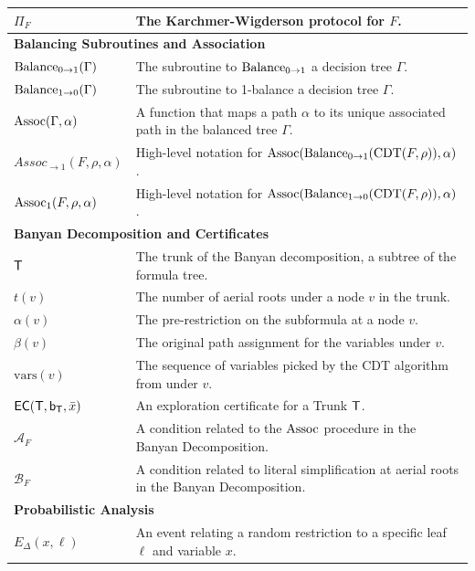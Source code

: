 \begin{table}[h!]
\begin{tabular}{|l|l|}
$\Pi_F$ & The Karchmer-Wigderson protocol for $F$. \\
\hline
\multicolumn{2}{|l|}{\textbf{Balancing Subroutines and Association}} \\
\hline
$\operatorname{Balance_{0 \to 1}}(\Gamma)$ & The subroutine to $\operatorname{Balance_{0 \to 1}}$ a decision tree $\Gamma$. \\
$\operatorname{Balance_{1 \to 0}}(\Gamma)$ & The subroutine to 1-balance a decision tree $\Gamma$. \\
$\operatorname{Assoc}(\Gamma, \alpha)$ & A function that maps a path $\alpha$ to its unique associated path in the balanced tree $\Gamma$. \\
$Assoc_{\to 1}(F, \rho, \alpha)$ & High-level notation for $\operatorname{Assoc}(\operatorname{Balance_{0 \to 1}}(\operatorname{CDT}(F, \rho)), \alpha)$. \\
$\operatorname{Assoc}_1(F, \rho, \alpha)$ & High-level notation for $\operatorname{Assoc}(\operatorname{Balance_{1 \to 0}}(\operatorname{CDT}(F, \rho)), \alpha)$. \\
\hline
\multicolumn{2}{|l|}{\textbf{Banyan Decomposition and Certificates}} \\
\hline
$\mathsf{T}$ & The trunk of the Banyan decomposition, a subtree of the formula tree. \\
$t(v)$ & The number of aerial roots under a node $v$ in the trunk. \\
$\alpha(v)$ & The pre-restriction on the subformula at a node $v$. \\
$\beta(v)$ & The original path assignment for the variables under $v$. \\
$\mathrm{vars}(v)$ & The sequence of variables picked by the CDT algorithm from under $v$. \\
$\mathsf{EC}(\mathsf{T}, \mathsf{b_T}, \bar{x})$ & An exploration certificate for a Trunk $\mathsf{T}$. \\
$\mathcal{A}_F$ & A condition related to the $\operatorname{Assoc}$ procedure in the Banyan Decomposition. \\
$\mathcal{B}_F$ & A condition related to literal simplification at aerial roots in the Banyan Decomposition. \\
\hline
\multicolumn{2}{|l|}{\textbf{Probabilistic Analysis}} \\
\hline
$E_{\Delta}(x, \ell)$ & An event relating a random restriction to a specific leaf $\ell$ and variable $x$. \\
\hline
\end{tabular}
\end{table}


